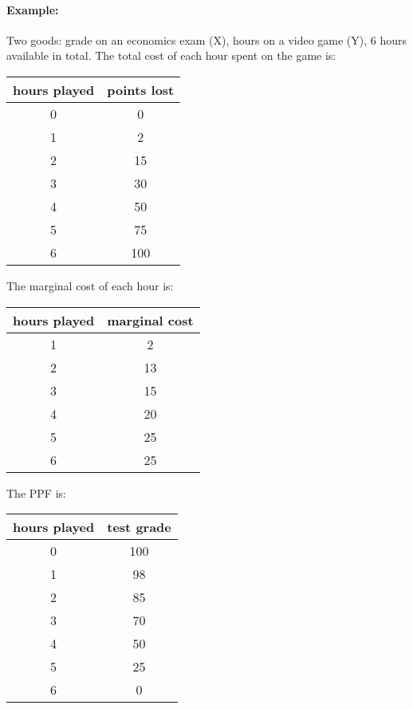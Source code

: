 \documentclass[letterpaper, 12pt]{article}
\begin{document}
\paragraph{Example:} Two goods: grade on an economics exam (X), hours on a
video game (Y), 6 hours available in total. The total cost of each hour spent
on the game is:
\begin{center}
  \begin{tabular}{|c|c|}
    \hline
    hours played & points lost \\ \hline
    0 & 0 \\ \hline
    1 & 2 \\ \hline
    2 & 15 \\ \hline
    3 & 30 \\ \hline
    4 & 50 \\ \hline
    5 & 75 \\ \hline
    6 & 100 \\ \hline
  \end{tabular}
\end{center}

The marginal cost of each hour is:
\begin{center}
  \begin{tabular}{|c|c|}
    \hline
    hours played & marginal cost \\ \hline
    1 & 2 \\ \hline
    2 & 13 \\ \hline
    3 & 15 \\ \hline
    4 & 20 \\ \hline
    5 & 25 \\ \hline
    6 & 25 \\ \hline
  \end{tabular}
\end{center}

The PPF is:
\begin{center}
  \begin{tabular}{|c|c|}
    \hline
    hours played & test grade \\ \hline
    0 & 100 \\ \hline
    1 & 98 \\ \hline
    2 & 85 \\ \hline
    3 & 70 \\ \hline
    4 & 50 \\ \hline
    5 & 25 \\ \hline
    6 & 0 \\ \hline
  \end{tabular}
\end{center}
\end{document}
